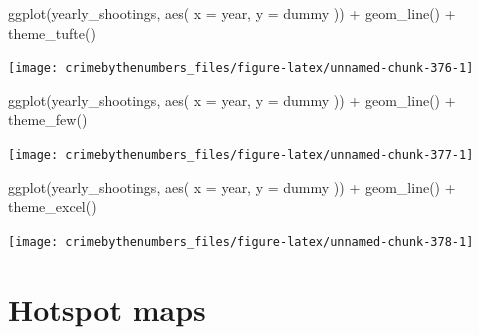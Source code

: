 \documentclass[
  a4paper,
]{krantz}
\makeatletter
\newenvironment{Shaded}{\begin{snugshade}}{\end{snugshade}}
\newcommand{\AttributeTok}[1]{\textcolor[rgb]{0.61,0.61,0.61}{#1}}
\newcommand{\FunctionTok}[1]{\textcolor[rgb]{0,0,0}{#1}}
\newcommand{\NormalTok}[1]{#1}
\newcommand{\SpecialCharTok}[1]{\textcolor[rgb]{0,0,0}{#1}}
\newenvironment{kframe}{%
\medskip{}
\setlength{\fboxsep}{.8em}
 \def\at@end@of@kframe{}%
 \ifinner\ifhmode%
  \def\at@end@of@kframe{\end{minipage}}%
  \begin{minipage}{\columnwidth}%
 \fi\fi%
 \def\FrameCommand##1{\hskip\@totalleftmargin \hskip-\fboxsep
 \colorbox{shadecolor}{##1}\hskip-\fboxsep
     \hskip-\linewidth \hskip-\@totalleftmargin \hskip\columnwidth}%
 \MakeFramed {\advance\hsize-\width
   \@totalleftmargin\z@ \linewidth\hsize
   \@setminipage}}%
 {\par\unskip\endMakeFramed%
 \at@end@of@kframe}
\renewenvironment{Shaded}{\begin{kframe}}{\end{kframe}}
\makeatother
\begin{document}
\begin{Shaded}
\begin{Highlighting}[]
\FunctionTok{ggplot}\NormalTok{(yearly\_shootings, }\FunctionTok{aes}\NormalTok{(}
  \AttributeTok{x =}\NormalTok{ year,}
  \AttributeTok{y =}\NormalTok{ dummy}
\NormalTok{)) }\SpecialCharTok{+}
  \FunctionTok{geom\_line}\NormalTok{() }\SpecialCharTok{+}
  \FunctionTok{theme\_tufte}\NormalTok{()}
\end{Highlighting}
\end{Shaded}

\begin{center}\texttt{[image: crimebythenumbers\_files/figure-latex/unnamed-chunk-376-1]} \end{center}

\begin{Shaded}
\begin{Highlighting}[]
\FunctionTok{ggplot}\NormalTok{(yearly\_shootings, }\FunctionTok{aes}\NormalTok{(}
  \AttributeTok{x =}\NormalTok{ year,}
  \AttributeTok{y =}\NormalTok{ dummy}
\NormalTok{)) }\SpecialCharTok{+}
  \FunctionTok{geom\_line}\NormalTok{() }\SpecialCharTok{+}
  \FunctionTok{theme\_few}\NormalTok{()}
\end{Highlighting}
\end{Shaded}

\begin{center}\texttt{[image: crimebythenumbers\_files/figure-latex/unnamed-chunk-377-1]} \end{center}

\begin{Shaded}
\begin{Highlighting}[]
\FunctionTok{ggplot}\NormalTok{(yearly\_shootings, }\FunctionTok{aes}\NormalTok{(}
  \AttributeTok{x =}\NormalTok{ year,}
  \AttributeTok{y =}\NormalTok{ dummy}
\NormalTok{)) }\SpecialCharTok{+}
  \FunctionTok{geom\_line}\NormalTok{() }\SpecialCharTok{+}
  \FunctionTok{theme\_excel}\NormalTok{()}
\end{Highlighting}
\end{Shaded}

\begin{center}\texttt{[image: crimebythenumbers\_files/figure-latex/unnamed-chunk-378-1]} \end{center}

\hypertarget{hotspot-maps}{%
\chapter{Hotspot maps}\label{hotspot-maps}}
\end{document}
